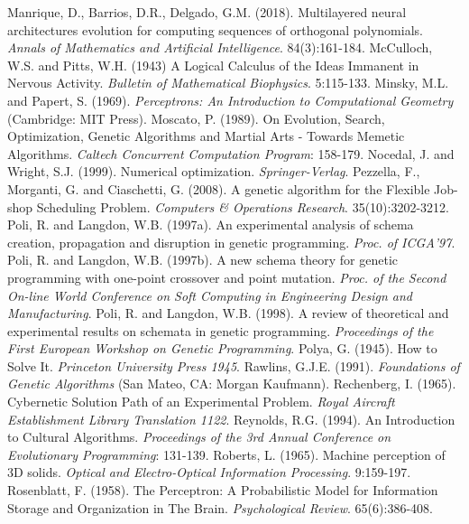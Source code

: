 \documentclass[spanish,a4paper,12pt,twoside]{report}
\begin{document}
\begin{thebibliography}{00}
   Manrique, D., Barrios, D.R., Delgado, G.M. (2018). Multilayered neural architectures evolution for computing sequences of orthogonal polynomials. \emph{Annals of Mathematics and Artificial Intelligence}. 84(3):161-184.
   McCulloch, W.S. and Pitts, W.H. (1943) A Logical Calculus of the Ideas Immanent in Nervous Activity. \emph{Bulletin of Mathematical Biophysics}. 5:115-133.
   Minsky, M.L. and Papert, S. (1969). \emph{Perceptrons: An Introduction to Computational Geometry} (Cambridge: MIT Press).
   Moscato, P. (1989). On Evolution, Search, Optimization, Genetic Algorithms and Martial Arts - Towards Memetic Algorithms. \emph{Caltech Concurrent Computation Program}: 158-179.
   Nocedal, J. and Wright, S.J. (1999). Numerical optimization. \emph{Springer-Verlag}.
   Pezzella, F., Morganti, G. and Ciaschetti, G. (2008). A genetic algorithm for the Flexible Job-shop Scheduling Problem. \emph{Computers \& Operations Research}. 35(10):3202-3212.
   Poli, R. and Langdon, W.B. (1997a). An experimental analysis of schema creation, propagation and disruption in genetic programming. \emph{Proc. of ICGA'97}.
   Poli, R. and Langdon, W.B. (1997b). A new schema theory for genetic programming with one-point crossover and point mutation. \emph{Proc. of the Second On-line World Conference on Soft Computing in Engineering Design and Manufacturing}.
   Poli, R. and Langdon, W.B. (1998). A review of theoretical and experimental results on schemata in genetic programming. \emph{Proceedings of the First European Workshop on Genetic Programming}.
   Polya, G. (1945). How to Solve It. \emph{Princeton University Press 1945}.
   Rawlins, G.J.E. (1991). \emph{Foundations of Genetic Algorithms} (San Mateo, CA: Morgan Kaufmann).
   Rechenberg, I. (1965). Cybernetic Solution Path of an Experimental Problem. \emph{Royal Aircraft Establishment Library Translation 1122}.
   Reynolds, R.G. (1994). An Introduction to Cultural Algorithms. \emph{Proceedings of the 3rd Annual Conference on Evolutionary Programming}: 131-139.
   Roberts, L. (1965). Machine perception of 3D solids. \emph{Optical and Electro-Optical Information Processing}. 9:159-197.
   Rosenblatt, F. (1958). The Perceptron: A Probabilistic Model for Information Storage and Organization in The Brain. \emph{Psychological Review}. 65(6):386-408.

\end{thebibliography}
\end{document}
